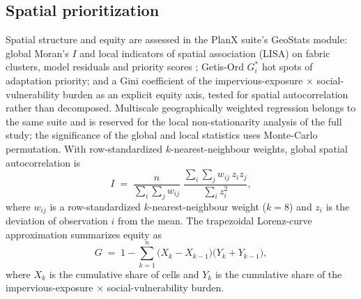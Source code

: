 \subsection{Spatial prioritization}
\label{sec:methods-spatial}
Spatial structure and equity are assessed in the PlanX suite's GeoStats module:
global
Moran's $I$ and local indicators of spatial association (LISA) on fabric clusters,
model residuals and priority scores \citep{sanchez2019SpotAnalysis,
purwanto2021SpatioteAnalysis}; Getis-Ord $G_i^{*}$ hot spots of adaptation
priority; and a Gini coefficient of the impervious-exposure $\times$
social-vulnerability burden as an explicit equity axis, tested for spatial
autocorrelation rather than decomposed. Multiscale geographically weighted
regression \citep{zhao2018GeographWeighted} belongs to the same suite and is
reserved for the local non-stationarity analysis of the full study; the
significance of the global and local statistics uses Monte-Carlo permutation.
With row-standardized $k$-nearest-neighbour weights, global spatial
autocorrelation is
\begin{equation}\label{eq:moran}
I \;=\; \frac{n}{\sum_{i}\sum_{j} w_{ij}}\;
\frac{\sum_{i}\sum_{j} w_{ij}\, z_{i} z_{j}}{\sum_{i} z_{i}^{2}},
\end{equation}
where $w_{ij}$ is a row-standardized $k$-nearest-neighbour weight ($k=8$)
and $z_i$ is the deviation of observation $i$ from the mean. The trapezoidal
Lorenz-curve approximation summarizes equity as
\begin{equation}\label{eq:gini}
G \;=\; 1 - \sum_{k=1}^{n} \bigl( X_{k} - X_{k-1} \bigr)
\bigl( Y_{k} + Y_{k-1} \bigr),
\end{equation}
where $X_k$ is the cumulative share of cells and $Y_k$ is the cumulative share
of the impervious-exposure $\times$ social-vulnerability burden.

